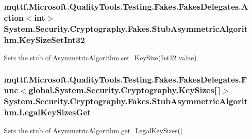 \hypertarget{class_system_1_1_security_1_1_cryptography_1_1_fakes_1_1_stub_asymmetric_algorithm_a5cac0f8fcf71ffb114ecd1da1ebbf9c6}{
\subsubsection[{Key\-Size\-Set\-Int32}]{\setlength{\rightskip}{0pt plus 5cm}mqttf.\-Microsoft.\-Quality\-Tools.\-Testing.\-Fakes.\-Fakes\-Delegates.\-Action$<$int$>$ System.\-Security.\-Cryptography.\-Fakes.\-Stub\-Asymmetric\-Algorithm.\-Key\-Size\-Set\-Int32}}\label{class_system_1_1_security_1_1_cryptography_1_1_fakes_1_1_stub_asymmetric_algorithm_a5cac0f8fcf71ffb114ecd1da1ebbf9c6}


Sets the stub of Asymmetric\-Algorithm.\-set\-\_\-\-Key\-Size(\-Int32 value)

\hypertarget{class_system_1_1_security_1_1_cryptography_1_1_fakes_1_1_stub_asymmetric_algorithm_a181300d4a2ee1ac27eb4e42e9ab35309}{
\subsubsection[{Legal\-Key\-Sizes\-Get}]{\setlength{\rightskip}{0pt plus 5cm}mqttf.\-Microsoft.\-Quality\-Tools.\-Testing.\-Fakes.\-Fakes\-Delegates.\-Func$<$global.\-System.\-Security.\-Cryptography.\-Key\-Sizes\mbox{[}$\,$\mbox{]}$>$ System.\-Security.\-Cryptography.\-Fakes.\-Stub\-Asymmetric\-Algorithm.\-Legal\-Key\-Sizes\-Get}}\label{class_system_1_1_security_1_1_cryptography_1_1_fakes_1_1_stub_asymmetric_algorithm_a181300d4a2ee1ac27eb4e42e9ab35309}


Sets the stub of Asymmetric\-Algorithm.\-get\-\_\-\-Legal\-Key\-Sizes()

